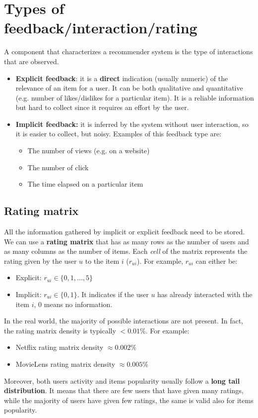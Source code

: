 \section{Types of feedback/interaction/rating}
A component that characterizes a recommender system is the type of interactions that are observed.
\begin{itemize}
    \item \textbf{Explicit feedback}: it is a \textbf{direct} indication (usually numeric) of the relevance of an item for a user. It can be both qualitative and quantitative (e.g. number of likes/dislikes for a particular item). It is a reliable information but hard to collect since it requires an effort by the user.
    \item \textbf{Implicit feedback:} it is inferred  by the system without user interaction, so it is easier to collect, but noisy. Examples of this feedback type are:
    \begin{itemize}
        \item The number of views (e.g. on a website)
        \item The number of click
        \item The time elapsed on a particular item
    \end{itemize}
\end{itemize}
\subsection{Rating matrix}
All the information gathered by implicit or explicit feedback need to be stored. We can use a \textbf{rating matrix} that has as many rows as the number of users and as many columns as the number of items. Each \textit{cell} of the matrix represents the rating given by the user $u$ to the item $i$ ($r_{ui}$). For example, $r_{ui}$ can either be:
\begin{itemize}
    \item Explicit: $r_{ui} \in \{0,1,...,5\}$
    \item Implicit: $r_{ui} \in \{0,1\}$. It indicates if the user $u$ has already interacted with the item $i$, 0 means no information. 
\end{itemize}
In the real world, the majority of possible interactions are not present. In fact, the rating matrix density is typically $< 0.01\%$. For example:
\begin{itemize}
    \item Netflix rating matrix density $\approx 0.002\%$
    \item MovieLens rating matrix density $\approx 0.005\%$
\end{itemize}
Moreover, both users activity and items popularity usually follow a \textbf{long tail distribution}. It means that there are few users that have given many ratings, while the majority of users have given few ratings, the same is valid also for items popularity.
